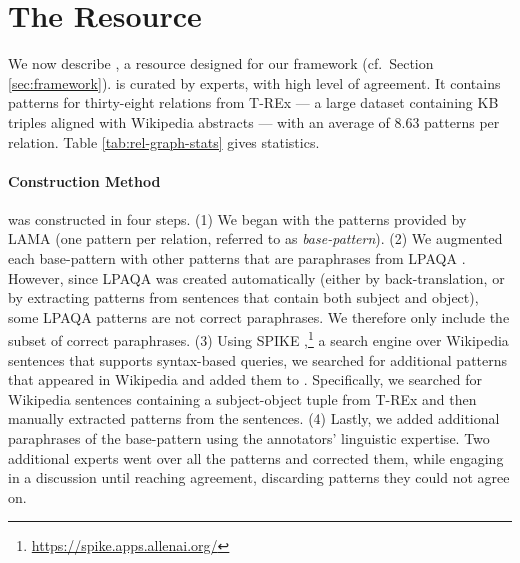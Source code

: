 \section{The \resource{} Resource}
\label{sec:rel-graph}

We now describe \resource{}, a
resource
designed for our framework (cf.\ Section \ref{sec:framework}).
\resource{} is curated by experts, with high level of agreement.
It contains patterns for thirty-eight relations from  T-REx \cite{trex} --- a large dataset containing KB triples aligned with Wikipedia abstracts --- with an average of 8.63 patterns per relation.
Table \ref{tab:rel-graph-stats} gives statistics.



\paragraph{Construction Method}
\resource{} was constructed in four steps. (1) We began with
the patterns provided by LAMA \cite{lama} (one pattern per
relation, referred to as \textit{base-pattern}). (2) We augmented each base-pattern with other patterns that are paraphrases from
LPAQA \cite{alpaqa}. However, since LPAQA was
created automatically (either by back-translation, or by extracting patterns from sentences that contain both subject and object), some LPAQA patterns are not
correct paraphrases.
We therefore only include the subset of correct paraphrases.
(3) Using SPIKE
\cite{spike},\footnote{\url{https://spike.apps.allenai.org/}}
a search engine over Wikipedia sentences that supports
syntax-based queries, we searched for additional patterns
that appeared in Wikipedia and added them to 
\resource{}. Specifically, we searched for Wikipedia sentences
containing a  subject-object
tuple from T-REx and then manually extracted 
patterns from the  sentences. (4) Lastly, we added
additional paraphrases of the base-pattern
using the annotators' linguistic expertise. Two additional
experts went over all the patterns and corrected them, while
engaging in a discussion until reaching  agreement,
discarding patterns they could not agree on.



